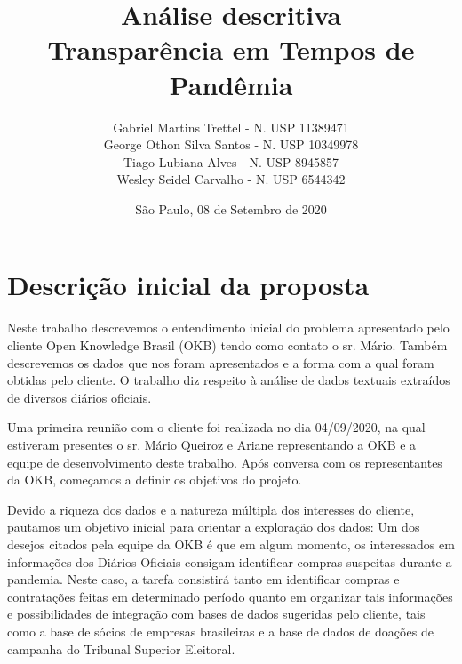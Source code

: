 \documentclass[10pt, a4paper]{article}
\begin{document}

\title{\textbf{   Análise descritiva  \\
                Transparência em Tempos de Pandêmia
                }\\[2em] }

\author{ Gabriel Martins Trettel - N. USP 11389471  \\
         George Othon Silva Santos - N. USP 10349978 \\
         Tiago Lubiana Alves - N. USP 8945857 \\
         Wesley Seidel Carvalho - N. USP 6544342 \\
        }
\date{  São Paulo, 08 de Setembro de 2020  }
\maketitle

\section{ Descrição inicial da proposta }

Neste trabalho descrevemos o entendimento inicial do problema apresentado pelo cliente Open Knowledge Brasil (OKB) tendo como contato o sr. Mário. Também descrevemos os dados que nos foram apresentados e a forma com a qual foram obtidas pelo cliente. O trabalho diz respeito à análise de dados textuais extraídos de diversos diários oficiais.

Uma primeira reunião com o cliente foi realizada no dia 04/09/2020, na qual estiveram presentes o sr. Mário Queiroz e Ariane representando a OKB e a equipe de desenvolvimento deste trabalho. Após conversa com os representantes da OKB, começamos a definir os objetivos do projeto.

Devido a riqueza dos dados e a natureza múltipla dos interesses do cliente, pautamos um objetivo inicial para orientar a exploração dos dados: Um dos desejos citados pela equipe da OKB é que em algum momento, os interessados em informações dos Diários Oficiais  consigam identificar compras suspeitas durante a pandemia. Neste caso, a tarefa consistirá tanto em identificar compras e contratações feitas em determinado período quanto em organizar tais informações e possibilidades de integração com bases de dados sugeridas pelo cliente, tais como a base de sócios de empresas brasileiras e a base de dados de doações de campanha do Tribunal Superior Eleitoral.
\end{document}

